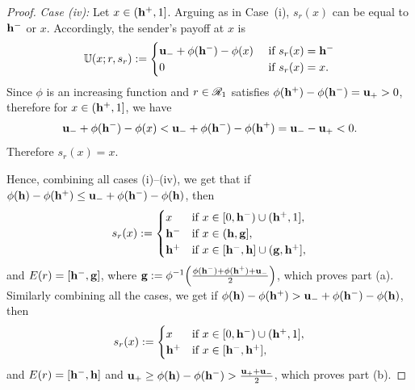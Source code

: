 \begin{proof}
\noindent \textit{Case (iv): }
		Let $x \in (\mathbf{h^{+}},1]$. Arguing as in Case~(i), $s_r(x)$ can be equal to $\mathbf{h^{-}}$ or $x$. Accordingly, the sender's payoff at $x$ is
			\[\mathbb{U}(x;r,s_r) := \begin{cases}
			\mathbf{u_-} + \phi(\mathbf{h^{-}}) - \phi(x) & \text{ if } s_r(x) = \mathbf{h^{-}} \\
			0& \text{ if }s_r(x) = x.\\
		\end{cases}\]
		Since $\phi$ is an increasing function and $r \in \mathscr{R}_1$ satisfies $\phi(\mathbf{h^{+}}) - \phi(\mathbf{h^{-}}) = \mathbf{u_+} > 0$, therefore for $x \in (\mathbf{h^{+}},1]$, we have
		\[\mathbf{u_-} + \phi(\mathbf{h^{-}}) - \phi(x) < \mathbf{u_-} + \phi(\mathbf{h^{-}}) - \phi(\mathbf{h^{+}}) = \mathbf{u_-} -\mathbf{u_+} < 0.\]
 		Therefore $s_r(x) = x$.

\noindent Hence, combining all cases (i)--(iv), we get that if $\phi(\mathbf{h}) - \phi(\mathbf{h^{+}}) \leq  \mathbf{u_-} + \phi(\mathbf{h^{-}}) - \phi(\mathbf{h})$, then
\begin{equation*}
   s_r(x) := \begin{cases}
       x &\text{if } x \in [0,\mathbf{h^{-}}) \cup (\mathbf{h^{+}},1],\\
       \mathbf{h^{-}} &\text{if } x \in (\mathbf{h},\mathbf{g}],\\
       \mathbf{h^{+}} &\text{if } x \in [\mathbf{h^{-}},\mathbf{h}] \cup (\mathbf{g},\mathbf{h^{+}}],
   \end{cases}
\end{equation*}
and $E(r) = [\mathbf{h^{-}},\mathbf{g}]$, where $\mathbf{g} := \phi^{-1}\Big(\frac{\phi(\mathbf{h^{-}}) + \phi(\mathbf{h^{+}}) + \mathbf{u_-}}{2}\Big)$, which proves part (a).\\
\noindent Similarly combining all the cases, we get if $\phi(\mathbf{h}) - \phi(\mathbf{h^{+}}) > \mathbf{u_-} + \phi(\mathbf{h^{-}}) - \phi(\mathbf{h})$, then
\begin{equation*}
   s_r(x) := \begin{cases}
       x &\text{if } x \in [0,\mathbf{h^{-}}) \cup (\mathbf{h^{+}},1],\\
       \mathbf{h^{+}} &\text{if } x \in [\mathbf{h^{-}},\mathbf{h^{+}}],
   \end{cases}
\end{equation*}
and $E(r) = [\mathbf{h^{-}},\mathbf{h}]$ and $\mathbf{u_+} \geq \phi(\mathbf{h}) - \phi(\mathbf{h^{-}}) > \frac{\mathbf{u_+} + \mathbf{u_-}}{2}$, which proves part (b).
\end{proof}

